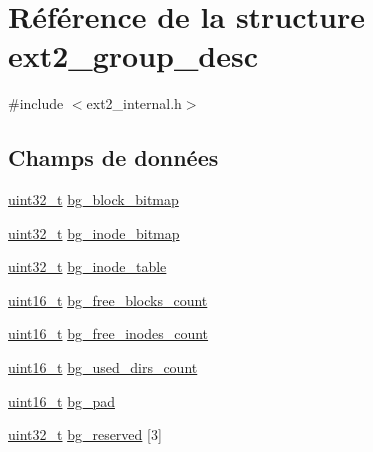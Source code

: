 \hypertarget{structext2__group__desc}{\section{Référence de la structure ext2\-\_\-group\-\_\-desc}
\label{structext2__group__desc}
}


{\ttfamily \#include $<$ext2\-\_\-internal.\-h$>$}

\subsection*{Champs de données}
\begin{DoxyCompactItemize}
\item 
\hyperlink{kernel_2include_2types_8h_a33594304e786b158f3fb30289278f5af}{uint32\-\_\-t} \hyperlink{structext2__group__desc_a57481ebe34986e28812cc9b4e122c016}{bg\-\_\-block\-\_\-bitmap}
\item 
\hyperlink{kernel_2include_2types_8h_a33594304e786b158f3fb30289278f5af}{uint32\-\_\-t} \hyperlink{structext2__group__desc_a7ba3737304b14529a45aede6381aa968}{bg\-\_\-inode\-\_\-bitmap}
\item 
\hyperlink{kernel_2include_2types_8h_a33594304e786b158f3fb30289278f5af}{uint32\-\_\-t} \hyperlink{structext2__group__desc_abf527c572a5fe30354cdf2cfc4f88b26}{bg\-\_\-inode\-\_\-table}
\item 
\hyperlink{kernel_2include_2types_8h_adf4d876453337156dde61095e1f20223}{uint16\-\_\-t} \hyperlink{structext2__group__desc_af1cf7574780c76da67e973179f6edd43}{bg\-\_\-free\-\_\-blocks\-\_\-count}
\item 
\hyperlink{kernel_2include_2types_8h_adf4d876453337156dde61095e1f20223}{uint16\-\_\-t} \hyperlink{structext2__group__desc_a5488cd2eb4ea863ca9d15a5df8da6bab}{bg\-\_\-free\-\_\-inodes\-\_\-count}
\item 
\hyperlink{kernel_2include_2types_8h_adf4d876453337156dde61095e1f20223}{uint16\-\_\-t} \hyperlink{structext2__group__desc_adc9924671cb04dd63b4b7ffff8c262dc}{bg\-\_\-used\-\_\-dirs\-\_\-count}
\item 
\hyperlink{kernel_2include_2types_8h_adf4d876453337156dde61095e1f20223}{uint16\-\_\-t} \hyperlink{structext2__group__desc_ac99983cee73aa4aace5c7d51b6d5a7e1}{bg\-\_\-pad}
\item 
\hyperlink{kernel_2include_2types_8h_a33594304e786b158f3fb30289278f5af}{uint32\-\_\-t} \hyperlink{structext2__group__desc_aff7f7dc0b67aed284218b238991f5c93}{bg\-\_\-reserved} \mbox{[}3\mbox{]}
\end{DoxyCompactItemize}


